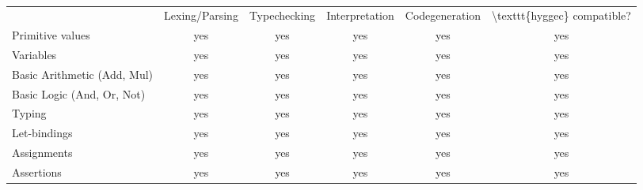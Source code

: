 \begin{table}[H]
\centering
\caption{}
\label{table:requirements_fulfillment}
\begin{tabular}{lccccc}
\cline{1-1}
\multicolumn{1}{|l|}{}       & \multicolumn{1}{l}{Lexing/Parsing} & \multicolumn{1}{l}{Typechecking} & \multicolumn{1}{l}{Interpretation} & \multicolumn{1}{l}{Codegeneration} & \multicolumn{1}{l}{\textbackslash{}texttt\{hyggec\} compatible?} \\ \cline{1-1}
Primitive values             & yes                                & yes                              & yes                                & yes                                & yes                                                              \\
Variables                    & yes                                & yes                              & yes                                & yes                                & yes                                                              \\
Basic Arithmetic (Add, Mul)  & yes                                & yes                              & yes                                & yes                                & yes                                                              \\
Basic Logic (And, Or, Not)   & yes                                & yes                              & yes                                & yes                                & yes                                                              \\
Typing                       & yes                                & yes                              & yes                                & yes                                & yes                                                              \\
Let-bindings                 & yes                                & yes                              & yes                                & yes                                & yes                                                              \\
Assignments                  & yes                                & yes                              & yes                                & yes                                & yes                                                              \\
Assertions                   & yes                                & yes                              & yes                                & yes                                & yes                                                              \\

\end{tabular}
\end{table}
